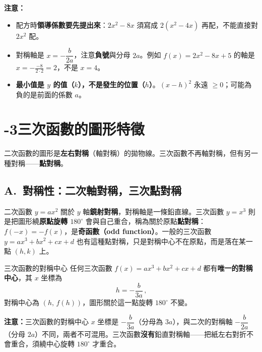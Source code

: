\documentclass[11pt]{article}
\begin{document}


\textbf{注意：}
\begin{itemize}\setlength{\itemsep}{1pt}
\item 配方時\textbf{領導係數要先提出來}：$2x^2-8x$ 須寫成 $2(x^2-4x)$ 再配，不能直接對 $2x^2$ 配。
\item 對稱軸是 $x=-\dfrac{b}{2a}$，注意\textbf{負號}與分母 $2a$。例如 $f(x)=2x^2-8x+5$ 的軸是 $x=-\tfrac{-8}{2\cdot2}=2$，不是 $x=4$。
\item \textbf{最小值是 $y$ 的值（$k$），不是發生的位置（$h$）}。$(x-h)^2$ 永遠 $\ge0$；可能為負的是前面的係數 $a$。
\end{itemize}

\section*{-3\quad 三次函數的圖形特徵}

二次函數的圖形是\textbf{左右對稱}（軸對稱）的拋物線。三次函數不再軸對稱，但有另一種對稱——\textbf{點對稱}。

\subsection*{\sffamily A.\ 對稱性：二次軸對稱，三次點對稱}

二次函數 $y=ax^2$ 關於 $y$ 軸\textbf{鏡射對稱}，對稱軸是一條鉛直線。三次函數 $y=x^3$ 則是把圖形繞\textbf{原點旋轉 $180^\circ$} 會與自己重合，稱為關於原點\textbf{點對稱}：$f(-x)=-f(x)$，是\textbf{奇函數（odd function）}。一般的三次函數 $y=ax^3+bx^2+cx+d$ 也有這種點對稱，只是對稱中心不在原點，而是落在某一點 $(h,k)$ 上。

\begin{補充框}{三次函數的對稱中心}
任何三次函數 $f(x)=ax^3+bx^2+cx+d$ 都有\textbf{唯一的對稱中心}，其 $x$ 坐標為
$$\boxed{\,h=-\frac{b}{3a}\,},$$
對稱中心為 $(h,\,f(h))$，圖形關於這一點旋轉 $180^\circ$ 不變。

\textbf{注意：}三次函數的對稱中心 $x$ 坐標是 $-\dfrac{b}{3a}$（分母為 $3a$），與二次的對稱軸 $-\dfrac{b}{2a}$（分母 $2a$）不同，兩者不可混用。三次函數\textbf{沒有}鉛直對稱軸——把紙左右對折不會重合，須繞中心旋轉 $180^\circ$ 才重合。
\end{補充框}
\end{document}
